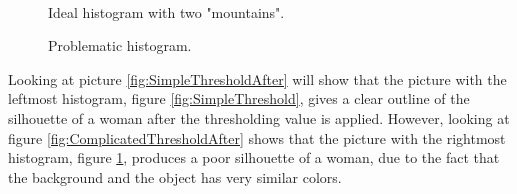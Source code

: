 \begin{figure}[htbp]
\begin{minipage}[b]{0.45\textwidth}
\end{minipage} \\ %
\begin{minipage}[t]{0.45\textwidth}
\caption{Ideal histogram with two "mountains".} %
\label{fig:SimpleThreshold}
\end{minipage} \hfill
\begin{minipage}[t]{0.45\textwidth}
\caption{Problematic histogram.} %
\label{fig:ComplicatedThreshold}
\end{minipage}
\end{figure}

Looking at picture \ref{fig:SimpleThresholdAfter} will show that the picture with the leftmost histogram, figure \ref{fig:SimpleThreshold}, gives a clear outline of the silhouette of a woman after the thresholding value is applied. However, looking at figure \ref{fig:ComplicatedThresholdAfter} shows that the picture with the rightmost histogram, figure \ref{fig:ComplicatedThreshold}, produces a poor silhouette of a woman, due to the fact that the background and the object has very similar colors. 

